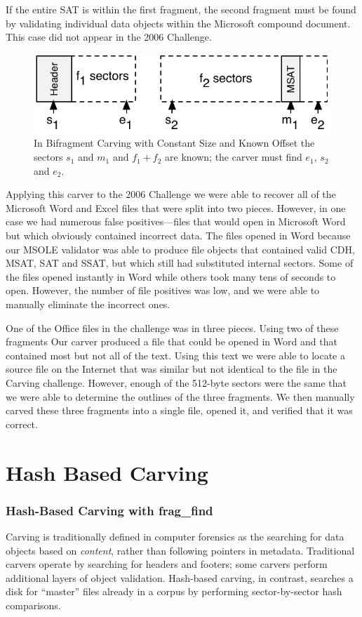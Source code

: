 \documentclass[11pt,letter]{article}
\begin{document}
If the entire SAT is within the first fragment, the second fragment
must be found by validating individual data objects within the
Microsoft compound document. This case did not appear in the 2006
Challenge.


\begin{figure}
\includegraphics[width=\columnwidth]{carving/msatcarving}
\caption{In Bifragment Carving with Constant Size and Known Offset the
sectors $s_1$ and $m_1$ and $f_1+f_2$ are known; the carver must find
$e_1$, $s_2$ and $e_2$.}\label{msatcarving}
\end{figure}

Applying this carver to the 2006 Challenge we were able to recover all of the Microsoft Word
and Excel files that were split into two pieces. However, in one case
we had numerous false positives---files that would open in Microsoft Word but
which obviously contained incorrect data. The files opened in Word
because our MSOLE validator was able to produce file objects that
contained valid CDH, MSAT, SAT and SSAT, but which still had
substituted internal sectors. Some of the files opened instantly in
Word while others took many tens of seconds to open. However, the
number of file positives was low, and we were able to manually
eliminate the incorrect ones.

One of the Office files in the  challenge was in three pieces. Using
two of these fragments Our carver produced a file that could be opened
in Word and that contained most but not all of the text. Using this
text we were able to locate a source file on the Internet that was
similar but not identical to the file in the Carving
challenge. However, enough of the 512-byte sectors were the same that
we were able to determine the outlines of the three fragments. We then
manually carved these three fragments into a single file, opened it,
and verified that it was correct.


\section{Hash Based Carving}

\subsubsection{Hash-Based  Carving with frag\_find}\label{hash-based}
Carving is traditionally defined in computer forensics as the
searching for data objects based on \emph{content}, rather than
following pointers in metadata\cite{garfinkel:carving07}. Traditional
carvers operate by searching for headers and footers; some carvers
perform additional layers of object validation. Hash-based carving, in
contrast, searches a disk for ``master'' files already in a corpus by
performing sector-by-sector hash comparisons.
\end{document}
